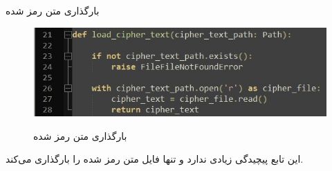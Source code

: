 \SubProblem
{بارگذاری متن رمز شده}
{
\begin{figure}[H]
    \centering
    \includegraphics[width=15cm]{Images/F2.jpg}
    \label{fig:label}
    \caption{بارگذاری متن رمز شده}
\end{figure}

این تابع پیچیدگی زیادی ندارد و تنها فایل متن رمز شده را بارگذاری می‌کند.
}
